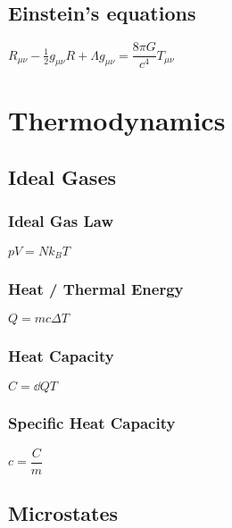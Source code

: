 		\subsection{Einstein's equations}
\begin{itemize}
\itemt \( R_{\mu\nu} - \frac{1}{2} g_{\mu\nu} R + \Lambda g_{\mu\nu}= \dfrac{8\pi G}{c^4} T_{\mu\nu} \)
\end{itemize}

	\section{Thermodynamics}



\subsection{Ideal Gases}

\subsubsection{Ideal Gas Law}
\begin{itemize}
\itemt \( pV = Nk_BT \)
\end{itemize}

\subsubsection{Heat / Thermal Energy}
\begin{itemize}
\itemt \( Q = mc \Delta T \)
\end{itemize}

\subsubsection{Heat Capacity}
\begin{itemize}
\itemt \( C = \dd{Q}{T} \)
\end{itemize}

\subsubsection{Specific Heat Capacity}
\begin{itemize}
\itemt \( c = \dfrac{C}{m} \)
\end{itemize}





\subsection{Microstates}

